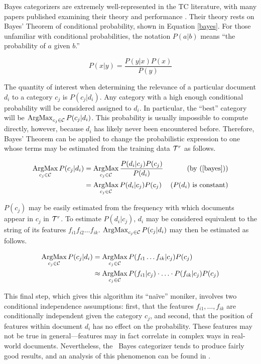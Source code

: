 \naive Bayes categorizers are extremely well-represented in the TC
literature, with many papers published examining their theory and
performance \cite{lewis:98,yang:99,sebastiani:02}.
Their theory rests on Bayes' Theorem of conditional probability, shown
in Equation \ref{bayes}.  For those unfamiliar with conditional
probabilities, the notation $P(a|b)$ means ``the probability of $a$
given $b$.''

\begin{equation} \label{bayes}
P(x|y) = \frac{P(y|x) P(x)}{P(y)}
\end{equation}

The quantity of interest when determining the relevance of a
particular document $d_i$ to a category $c_j$ is $P(c_j|d_i)$.  Any
category with a high enough conditional probability will be considered
assigned to $d_i$.  In particular, the ``best'' category will be
$\operatorname*{ArgMax}_{c_j\in\mathcal{C}} P(c_j|d_i)$. This probability is usually impossible to
compute directly, however, because $d_i$ has likely never been
encountered before.  Therefore, Bayes' Theorem can be applied to
change the probabilistic expression to one whose terms may be
estimated from the training data $\mathcal{T}^r$ as follows.

\begin{align*}
\operatorname*{ArgMax}_{c_j\in\mathcal{C}} P(c_j|d_i) 
 & = \operatorname*{ArgMax}_{c_j\in\mathcal{C}} \frac{P(d_i|c_j) P(c_j)}{P(d_i)} & (\text{by (\ref{bayes})}) \\
 & = \operatorname*{ArgMax}_{c_j\in\mathcal{C}} P(d_i|c_j) P(c_j) & (P(d_i) \text{ is constant})
\end{align*}

$P(c_j)$ may be easily estimated from the frequency with which
documents appear in $c_j$ in $\mathcal{T}^r$.  To estimate $P(d_i|c_j)$,
$d_i$ may be considered equivalent to the string of its features
$f_{i1} f_{i2} \ldots f_{ik}$.  $\operatorname*{ArgMax}_{c_j\in\mathcal{C}} P(c_j|d_i)$ may
then be estimated as follows.

\begin{align*}
\operatorname*{ArgMax}_{c_j\in\mathcal{C}} P(c_j|d_i) 
 & = \operatorname*{ArgMax}_{c_j\in\mathcal{C}} P(f_{i1} \ldots f_{ik}|c_j) P(c_j) \\
 & \approx \operatorname*{ArgMax}_{c_j\in\mathcal{C}} P(f_{i1}|c_j) \cdot \ldots \cdot P(f_{ik}|c_j) P(c_j)
\end{align*}

This final step, which gives this algorithm its ``na\"ive'' moniker,
involves two conditional independence assumptions: first, that the
features $f_{i1}, \ldots, f_{ik}$ are conditionally independent given
the category $c_j$, and second, that the position of features within
document $d_i$ has no effect on the probability.  These features may
not be true in general---features may in fact correlate in complex
ways in real-world documents.  Nevertheless, the \naive\ Bayes
categorizer tends to produce fairly good results, and an analysis of
this phenomenon can be found in \cite{domingos:97}.

